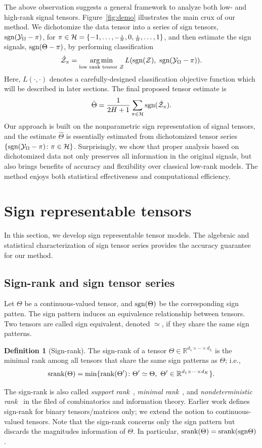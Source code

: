 \documentclass{article}
\theoremstyle{plain}
\theoremstyle{definition}
\newtheorem{defn}{Definition}
\def\sign{\textup{sgn}}
\def\srank{\textup{srank}}
\def\rank{\textup{rank}}
\begin{document}
The above observation suggests a general framework to analyze both low- and high-rank signal tensors. Figure~\ref{fig:demo} illustrates the main crux of our method. We dichotomize the data tensor into a series of sign tensors, $\sign (\tY_\Omega-\pi)$, for $\pi\in \mathcal{H}=\{-1,\ldots, {\scriptstyle -{1\over H}},0,{\scriptstyle {1\over H}},\ldots,1\}$, and then estimate the sign signals, $\sign(\Theta-\pi)$, by performing classification
\[
\hat \tZ_\pi=\argmin_{\text{low rank tensor $\tZ$}} L(\sign(\tZ),\ \sign (\tY_\Omega-\pi)).
\]
Here, $L(\cdot,\cdot)$ denotes a carefully-designed classification objective function which will be described in later sections. The final proposed tensor estimate is 
\[
\hat \Theta = {1\over 2H+1}\sum_{\pi \in \tH} \sign(\hat \tZ_\pi).
\]
Our approach is built on the nonparametric sign representation of signal tensors, and the estimate $\hat \Theta$ is essentially estimated from dichotomized tensor series $\{\sign(\tY_\Omega-\pi)\colon \pi \in \tH\}$. Surprisingly, we show that proper analysis based on dichotomized data not only preserves all information in the original signals, but also brings benefits of accuracy and flexibility over classical low-rank models. The method enjoys both statistical effectiveness and computational efficiency. 


\section{Sign representable tensors}\label{sec:representation}
In this section, we develop sign representable tensor models. The algebraic and statistical characterization of sign tensor series provides the accuracy guarantee for our method. 

\subsection{Sign-rank and sign tensor series}\label{sec:sign-rank}
Let $\Theta$ be a continuous-valued tensor, and $\sign (\Theta)$ be the corresponding sign patten. The sign pattern induces an equivalence relationship between tensors. Two tensors are called sign equivalent, denoted $\simeq$, if they share the same sign patterns. 

\begin{defn}[Sign-rank]
The sign-rank of a tensor $\Theta\in\mathbb{R}^{d_1\times \cdots \times d_L}$ is the minimal rank among all tensors that share the same sign patterns as $\Theta$; i.e.,
\[
\srank(\Theta) = \min \{\rank(\Theta')\colon  \Theta'\simeq \Theta,\ \Theta'\in\mathbb{R}^{d_1\times \cdots \times d_K}\}.
\]
\end{defn}
The sign-rank is also called \emph{support rank}~\cite{cohn2013fast}, \emph{minimal rank}~\cite{alon2016sign}, and \emph{nondeterministic rank}~\cite{de2003nondeterministic} in the filed of combinatorics and information theory. Earlier work defines sign-rank for binary tensors/matrices only; we extend the notion to continuous-valued tensors. Note that the sign-rank concerns only the sign pattern but discards the magnitudes information of $\Theta$. In particular, $\srank(\Theta)=\srank(\sign \Theta)$. 
\end{document}
